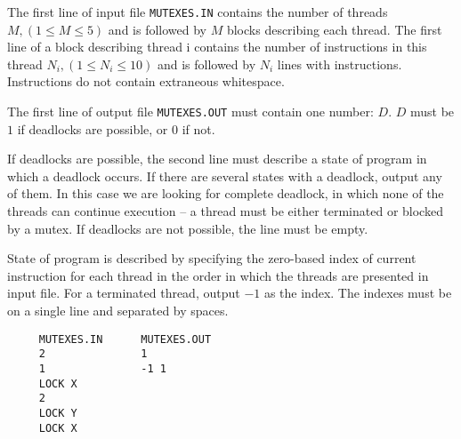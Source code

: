 The first line of input file \verb|MUTEXES.IN| contains the number of threads
$M, (1 \leq M \leq 5)$ and is followed by $M$ blocks describing each thread. The first
line of a block describing thread i contains the number of instructions in this thread
$N_i, (1 \leq N_i \leq 10)$ and is followed by $N_i$ lines with instructions.
Instructions do not contain extraneous whitespace.

The first line of output file \verb|MUTEXES.OUT| must contain one number: $D$.
$D$ must be $1$ if deadlocks are possible, or $0$ if not. 

If deadlocks are possible, the second line must describe a state of program in which a
deadlock occurs. If there are several states with a deadlock, output any of them. In
this case we are looking for complete deadlock, in which none of the threads can
continue execution -- a thread must be either terminated or blocked by a mutex. If
deadlocks are not possible, the line must be empty.

State of program is described by specifying the zero-based index of current instruction
for each thread in the order in which the threads are presented in input file. For a
terminated thread, output $-1$ as the index. The indexes must be on a single line and
separated by spaces.


\begin{verbatim}
     MUTEXES.IN      MUTEXES.OUT
     2               1
     1               -1 1 
     LOCK X
     2
     LOCK Y
     LOCK X
\end{verbatim}
\newpage
